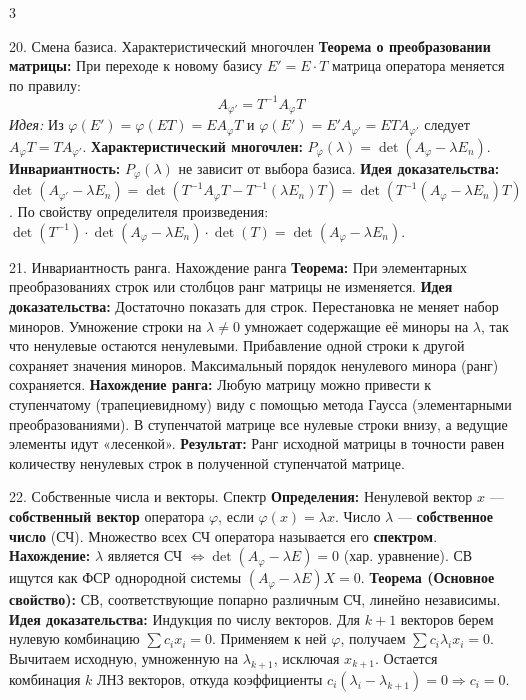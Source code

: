 \documentclass[8pt, a4paper, landscape]{extarticle}
\newcommand{\Ra}{\Rightarrow}
\begin{document}
\begin{multicols*}{3}
\begin{ticket}{20. Смена базиса. Характеристический многочлен}
\textbf{Теорема о преобразовании матрицы:} При переходе к новому базису $E' = E \cdot T$ матрица оператора меняется по правилу:
\[A_{\varphi'} = T^{-1} A_\varphi T\]
\textit{Идея:} Из $\varphi(E') = \varphi(ET) = EA_\varphi T$ и $\varphi(E') = E'A_{\varphi'} = ETA_{\varphi'}$ следует $A_\varphi T = T A_{\varphi'}$.
\tcblower
\textbf{Характеристический многочлен:} $P_\varphi(\lambda) = \det(A_\varphi - \lambda E_n)$.
\textbf{Инвариантность:} $P_\varphi(\lambda)$ не зависит от выбора базиса.
\textbf{Идея доказательства:} 
$\det(A_{\varphi'} - \lambda E_n) = \det(T^{-1}A_\varphi T - T^{-1}(\lambda E_n)T) = \det(T^{-1}(A_\varphi - \lambda E_n)T)$.
По свойству определителя произведения: $\det(T^{-1}) \cdot \det(A_\varphi - \lambda E_n) \cdot \det(T) = \det(A_\varphi - \lambda E_n)$.
\end{ticket}

\begin{ticket}{21. Инвариантность ранга. Нахождение ранга}
\textbf{Теорема:} При элементарных преобразованиях строк или столбцов ранг матрицы не изменяется.
\textbf{Идея доказательства:} Достаточно показать для строк. Перестановка не меняет набор миноров. Умножение строки на $\lambda \neq 0$ умножает содержащие её миноры на $\lambda$, так что ненулевые остаются ненулевыми. Прибавление одной строки к другой сохраняет значения миноров. Максимальный порядок ненулевого минора (ранг) сохраняется.
\tcblower
\textbf{Нахождение ранга:} Любую матрицу можно привести к ступенчатому (трапециевидному) виду с помощью метода Гаусса (элементарными преобразованиями). 
В ступенчатой матрице все нулевые строки внизу, а ведущие элементы идут «лесенкой». 
\textbf{Результат:} Ранг исходной матрицы в точности равен количеству ненулевых строк в полученной ступенчатой матрице.
\end{ticket}

\begin{ticket}{22. Собственные числа и векторы. Спектр}
\textbf{Определения:} Ненулевой вектор $x$ --- \textbf{собственный вектор} оператора $\varphi$, если $\varphi(x) = \lambda x$. Число $\lambda$ --- \textbf{собственное число} (СЧ).
Множество всех СЧ оператора называется его \textbf{спектром}.
\textbf{Нахождение:} $\lambda$ является СЧ $\Leftrightarrow \det(A_\varphi - \lambda E) = 0$ (хар. уравнение). СВ ищутся как ФСР однородной системы $(A_\varphi - \lambda E)X = 0$.
\tcblower
\textbf{Теорема (Основное свойство):} СВ, соответствующие попарно различным СЧ, линейно независимы.
\textbf{Идея доказательства:} Индукция по числу векторов. Для $k+1$ векторов берем нулевую комбинацию $\sum c_i x_i = 0$. Применяем к ней $\varphi$, получаем $\sum c_i \lambda_i x_i = 0$. Вычитаем исходную, умноженную на $\lambda_{k+1}$, исключая $x_{k+1}$. Остается комбинация $k$ ЛНЗ векторов, откуда коэффициенты $c_i(\lambda_i - \lambda_{k+1}) = 0 \Ra c_i=0$.
\end{ticket}


\end{multicols*}
\end{document}
